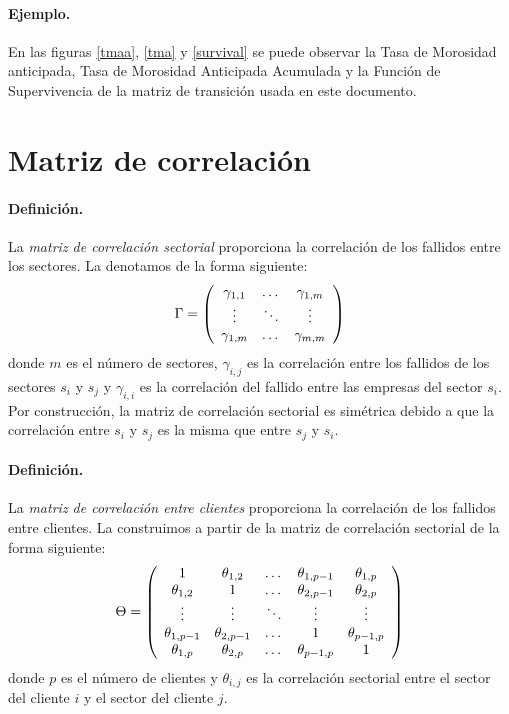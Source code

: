 \paragraph{Ejemplo.} En las figuras \ref{tmaa}, \ref{tma} y \ref{survival} 
se puede observar la Tasa de Morosidad anticipada, Tasa de Morosidad Anticipada 
Acumulada y la Funci\'on de Supervivencia de la matriz de transici\'on usada en 
este documento.


\section{Matriz de correlaci\'on}
\label{sec:mcorrel}

\paragraph{Definici\'on.} La \emph{matriz de correlaci\'on sectorial}
 proporciona la correlaci\'on de los
fallidos entre los sectores. La denotamos de la forma siguiente:
\begin{displaymath}
\Gamma = \left(
\begin{array}{ccc}
\gamma_{1,1} & \dots  & \gamma_{1,m} \cr
\vdots & \ddots & \vdots \cr
\gamma_{1,m} & \dots  & \gamma_{m,m} 
\end{array}
\right)
\end{displaymath}
donde $m$ es el n\'umero de sectores, $\gamma_{i,j}$ es la correlaci\'on entre 
los fallidos de los sectores $s_i$ y $s_j$ y $\gamma_{i,i}$ es la correlaci\'on del 
fallido entre las empresas del sector $s_i$. Por construcci\'on, la matriz de 
correlaci\'on sectorial es sim\'etrica debido a que la correlaci\'on entre $s_i$
y $s_j$ es la misma que entre $s_j$ y $s_i$.

\paragraph{Definici\'on.} La \emph{matriz de correlaci\'on entre clientes}
 proporciona la correlaci\'on de los
fallidos entre clientes. La construimos a partir de la matriz de correlaci\'on sectorial
de la forma siguiente:
\begin{displaymath}
\Theta = \left(
\begin{array}{ccccc}
1              & \theta_{1,2}   & \dots      & \theta_{1,p-1} & \theta_{1,p}   \cr
\theta_{1,2}   & 1              & \dots      & \theta_{2,p-1} & \theta_{2,p}   \cr
\vdots         & \vdots         & \ddots     & \vdots         & \vdots         \cr
\theta_{1,p-1} & \theta_{2,p-1} & \dots      & 1              & \theta_{p-1,p} \cr
\theta_{1,p}   & \theta_{2,p}   & \dots      & \theta_{p-1,p} & 1
\end{array}
\right)
\end{displaymath}
donde $p$ es el n\'umero de clientes y $\theta_{i,j}$ es la correlaci\'on sectorial
entre el sector del cliente $i$ y el sector del cliente $j$.

